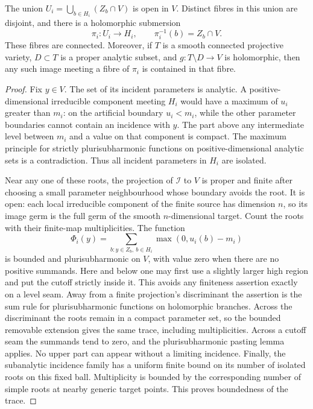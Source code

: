 \begin{lemma}\label{lem:quo-incidence}
The union $U_i=\bigcup_{b\in H_i}(Z_b\cap V)$ is open in $V$. Distinct fibres in this union are disjoint, and there is a holomorphic submersion
\[
 \pi_i:U_i\longrightarrow H_i,
 \qquad \pi_i^{-1}(b)=Z_b\cap V.
\]
These fibres are connected. Moreover, if $T$ is a smooth connected projective variety, $D\subset T$ is a proper analytic subset, and $g:T\setminus D\to V$ is holomorphic, then any such image meeting a fibre of $\pi_i$ is contained in that fibre.
\end{lemma}
\begin{proof}
Fix $y\in V$. The set of its incident parameters is analytic. A positive-dimensional irreducible component meeting $H_i$ would have a maximum of $u_i$ greater than $m_i$: on the artificial boundary $u_i<m_i$, while the other parameter boundaries cannot contain an incidence with $y$. The part above any intermediate level between $m_i$ and a value on that component is compact. The maximum principle for strictly plurisubharmonic functions on positive-dimensional analytic sets is a contradiction. Thus all incident parameters in $H_i$ are isolated.

Near any one of these roots, the projection of $\mathcal{I}$ to $V$ is proper and finite after choosing a small parameter neighbourhood whose boundary avoids the root. It is open: each local irreducible component of the finite source has dimension $n$, so its image germ is the full germ of the smooth $n$-dimensional target. Count the roots with their finite-map multiplicities. The function
\begin{equation}\label{eq:quo-trace}
 \Phi_i(y)=\sum_{b:y\in Z_b,\ b\in H_i}
                    \max(0,u_i(b)-m_i)
\end{equation}
is bounded and plurisubharmonic on $V$, with value zero when there are no positive summands. Here and below one may first use a slightly larger high region and put the cutoff strictly inside it. This avoids any finiteness assertion exactly on a level seam. Away from a finite projection's discriminant the assertion is the sum rule for plurisubharmonic functions on holomorphic branches. Across the discriminant the roots remain in a compact parameter set, so the bounded removable extension gives the same trace, including multiplicities. Across a cutoff seam the summands tend to zero, and the plurisubharmonic pasting lemma applies. No upper part can appear without a limiting incidence. Finally, the subanalytic incidence family has a uniform finite bound on its number of isolated roots on this fixed ball. Multiplicity is bounded by the corresponding number of simple roots at nearby generic target points. This proves boundedness of the trace.


\end{proof}
